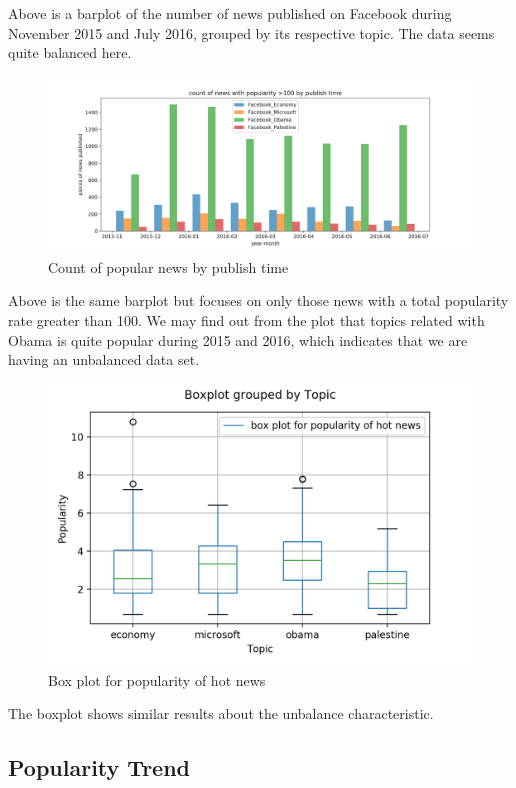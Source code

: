 \documentclass{article}
\begin{document}
Above is a barplot of the number of news published on Facebook during November 2015 and July 2016, grouped by its respective topic. The data seems quite balanced here.

\begin{figure}[H]
\centering
\includegraphics[scale=0.17]{"count of news with popularity larger than 100 by publish time"}
\caption{Count of popular news by publish time}
\end{figure}

Above is the same barplot but focuses on only those news with a total popularity rate greater than 100. We may find out from the plot that topics related with Obama is quite popular during 2015 and 2016, which indicates that we are having an unbalanced data set.

\begin{figure}[H]
\centering
\includegraphics[scale=0.5]{"box plot for popularity of hot news"}
\caption{Box plot for popularity of hot news}
\end{figure}

The boxplot shows similar results about the unbalance characteristic.

 
\subsection{Popularity Trend}
\end{document}
